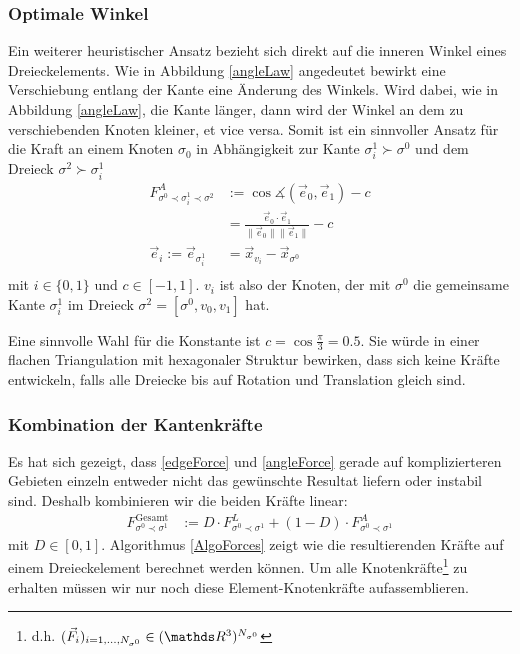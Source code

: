   \subsubsection{Optimale Winkel}
    Ein weiterer heuristischer Ansatz bezieht sich direkt auf die inneren Winkel eines Dreieckelements. 
    Wie in Abbildung \ref{angleLaw} angedeutet bewirkt eine Verschiebung entlang der Kante eine Änderung des Winkels.
    Wird dabei, wie in Abbildung \ref{angleLaw}, die Kante länger, dann wird der Winkel an dem zu verschiebenden Knoten kleiner, et vice versa. 
    Somit ist ein sinnvoller Ansatz für die Kraft an einem Knoten \( \sigma_{0} \) in Abhängigkeit 
    zur Kante \( \sigma^{1}_{i}\succ\sigma^{0} \) und dem Dreieck \( \sigma^{2}\succ\sigma^{1}_{i} \) 
    \begin{align}
       F^{A}_{\sigma^{0}\prec\sigma^{1}_{i}\prec\sigma^{2}} &:= \cos\measuredangle(\vec{e}_{0},\vec{e}_{1}) - c \label{angleForce}\\
                              &= \frac{\vec{e}_{0} \cdot \vec{e}_{1}}{\|\vec{e}_{0}\|\|\vec{e}_{1}\|} - c \\
       \vec{e}_{i} := \vec{e}_{\sigma^{1}_{i}} &= \vec{x}_{v_{i}} - \vec{x}_{\sigma^{0}}\\
    \end{align}
    mit \( i\in\{0,1\} \) und \( c\in[-1,1] \). 
    \( v_{i} \) ist also der Knoten, der mit \( \sigma^{0} \) die gemeinsame Kante \( \sigma^{1}_{i} \) 
    im Dreieck \( \sigma^{2} = [\sigma^{0},v_{0},v_{1}] \) hat.
    
    Eine sinnvolle Wahl für die Konstante ist \( c = \cos \frac{\pi}{3} = 0.5\).
    Sie würde in einer flachen Triangulation mit hexagonaler Struktur bewirken, dass sich keine Kräfte entwickeln, falls alle Dreiecke bis auf Rotation und Translation gleich sind.

  \subsubsection{Kombination der Kantenkräfte}
    Es hat sich gezeigt, dass \eqref{edgeForce} und \eqref{angleForce} gerade auf komplizierteren Gebieten einzeln entweder nicht das gewünschte Resultat liefern oder instabil sind.
    Deshalb kombinieren wir die beiden Kräfte linear:
    \begin{align}
      F^{\text{Gesamt}}_{\sigma^{0}\prec\sigma^{1}} &:= D \cdot F^{L}_{\sigma^{0}\prec\sigma^{1}} + (1-D) \cdot F^{A}_{\sigma^{0}\prec\sigma^{1}}
    \end{align}
    mit \( D\in[0,1] \).
    Algorithmus \ref{AlgoForces} zeigt wie die resultierenden Kräfte auf einem Dreieckelement berechnet werden können. 
    Um alle Knotenkräfte\footnote{d.h. \((\vec{F}_{i})_{i=1,\ldots, N_{\sigma^{0}}}\in (\R^{3})^{N_{\sigma^{0}}} \)} zu erhalten müssen wir nur noch diese Element-Knotenkräfte aufassemblieren. 
    
